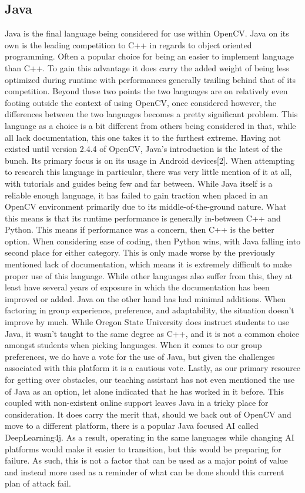\documentclass[onecolumn, draftclsnofoot,10pt, compsoc]{IEEEtran}
\begin{document}
\subsection{Java}
Java is the final language being considered for use within OpenCV. Java on its own is the leading competition to C++ in regards to object oriented programming. Often a popular choice for being an easier to implement language than C++. To gain this advantage it does carry the added weight of being less optimized during runtime with performances generally trailing behind that of its competition. Beyond these two points the two languages are on relatively even footing outside the context of using OpenCV, once considered however, the differences between the two languages becomes a pretty significant problem. This language as a choice is a bit different from others being considered in that, while all lack documentation, this one takes it to the furthest extreme. Having not existed until version 2.4.4 of OpenCV, Java’s introduction is the latest of the bunch. Its primary focus is on its usage in Android devices[2]. When attempting to research this language in particular, there was very little mention of it at all, with tutorials and guides being few and far between. While Java itself is a reliable enough language, it has failed to gain traction when placed in an OpenCV environment primarily due to its middle-of-the-ground nature. What this means is that its runtime performance is generally in-between C++ and Python. This means if performance was a concern, then C++ is the better option. When considering ease of coding, then Python wins, with Java falling into second place for either category. This is only made worse by the previously mentioned lack of documentation, which means it is extremely difficult to make proper use of this language. While other languages also suffer from this, they at least have several years of exposure in which the documentation has been improved or added. Java on the other hand has had minimal additions. When factoring in group experience, preference, and adaptability, the situation doesn’t improve by much. While Oregon State University does instruct students to use Java, it wasn’t taught to the same degree as C++, and it is not a common choice amongst students when picking languages. When it comes to our group preferences, we do have a vote for the use of Java, but given the challenges associated with this platform it is a cautious vote. Lastly, as our primary resource for getting over obstacles, our teaching assistant has not even mentioned the use of Java as an option, let alone indicated that he has worked in it before. This coupled with non-existent online support leaves Java in a tricky place for consideration. It does carry the merit that, should we back out of OpenCV and move to a different platform, there is a popular Java focused AI called DeepLearning4j. As a result, operating in the same languages while changing AI platforms would make it easier to transition, but this would be preparing for failure. As such, this is not a factor that can be used as a major point of value and instead more used as a reminder of what can be done should this current plan of attack fail. 
\end{document}

